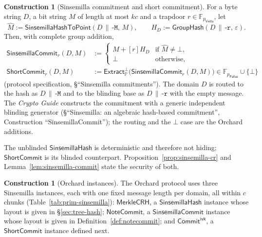 \documentclass[11pt,a4paper]{article}
\theoremstyle{definition}
\newtheorem{construction}[theorem]{Construction}
\newcommand{\F}{\mathbb{F}}
\newcommand{\PP}{\mathbb{P}}
\newcommand{\Pallas}{\ensuremath{\mathsf{Pallas}}}
\newcommand{\Vesta}{\ensuremath{\mathsf{Vesta}}}
\newcommand{\NoteCommit}{\ensuremath{\mathsf{NoteCommit}}}
\newcommand{\ShortCommit}{\ensuremath{\mathsf{ShortCommit}}}
\newcommand{\CommitIvk}{\ensuremath{\mathsf{Commit}^{\mathsf{ivk}}}}
\newcommand{\Extract}{\ensuremath{\mathsf{Extract}}}
\newcommand{\GroupHash}{\ensuremath{\mathsf{GroupHash}}}
\begin{document}
\begin{construction}[Sinsemilla commitment and short commitment]
For a byte string $D$, a bit string $M$ of length at most $kc$ and a
trapdoor $r \in \F_{p_{\Vesta}}$, let
\[
  \hat{M} := \mathsf{SinsemillaHashToPoint}(D \,\|\, \texttt{-M},\, M),
  \qquad
  H_D := \GroupHash(D \,\|\, \texttt{-r},\, \varepsilon).
\]
Then, with complete group addition,
\begin{align*}
  \mathsf{SinsemillaCommit}_r(D, M) &:=
    \begin{cases}
      \hat{M} + [r] H_D & \text{if } \hat{M} \neq \bot, \\
      \bot & \text{otherwise},
    \end{cases} \\
  \ShortCommit_r(D, M) &:= \Extract_{\PP}^{\bot}\bigl(
    \mathsf{SinsemillaCommit}_r(D, M)\bigr)
    \in \F_{p_{\Pallas}} \cup \{\bot\}
\end{align*}
(protocol specification, \S``Sinsemilla commitments''). The domain $D$ is
routed to the hash as $D \,\|\, \texttt{-M}$ and to the blinding base as
$D \,\|\, \texttt{-r}$ with the empty message. The \emph{Crypto Guide}
constructs the commitment with a generic independent blinding generator
(\S``Sinsemilla: an algebraic hash-based commitment'', Construction
``SinsemillaCommit''); the routing and the $\bot$ case are the
Orchard additions.
\end{construction}

The unblinded $\mathsf{SinsemillaHash}$ is deterministic and therefore not
hiding; $\ShortCommit$ is its blinded counterpart.
Proposition~\ref{prop:sinsemilla-cr} and Lemma~\ref{lem:sinsemilla-commit}
state the security of both.

\begin{construction}[Orchard instances]
The Orchard protocol uses three Sinsemilla instances, each with one fixed
message length per domain, all within $c$ chunks
(Table~\ref{tab:prim-sinsemilla}): $\mathsf{MerkleCRH}$, a
$\mathsf{SinsemillaHash}$ instance whose layout is given in
\S\ref{sec:tree-hash}; $\NoteCommit$, a $\mathsf{SinsemillaCommit}$ instance
whose layout is given in Definition~\ref{def:notecommit}; and $\CommitIvk$, a
$\ShortCommit$ instance defined next.
\end{construction}
\end{document}
